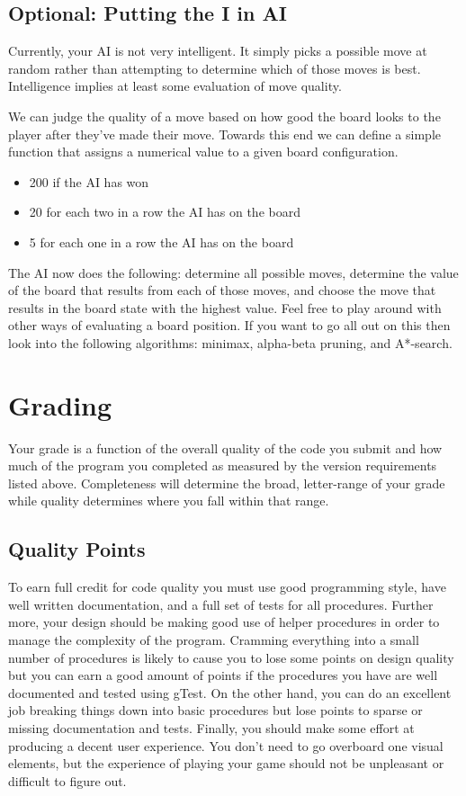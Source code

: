\documentclass[]{tufte-handout}
\begin{document}
\subsection{Optional: Putting the I in AI}

Currently, your AI is not very intelligent. It simply picks a possible move at random
rather than attempting to determine which of those moves is best. Intelligence
implies at least some evaluation of move quality.

We can judge the quality of a move based on how good the board looks to the player
after they've made their move. Towards this end we can define a simple function
that assigns a numerical value to a given board configuration.
\begin{itemize}
  \item 200 if the AI has won
  \item 20 for each two in a row the AI has on the board
  \item 5 for each one in a row the AI has on the board
\end{itemize}
The AI now does the following: determine all possible moves, determine the value
of the board that results from each of those moves, and choose the move that
results in the board state with the highest value. Feel free to play around with
other ways of evaluating a board position. If you want to go all out on this then
look into the following algorithms: minimax, alpha-beta pruning, and A*-search.

\section{Grading}

Your grade is a function of the overall quality of the code you submit and how much of the
program you completed as measured by the version requirements listed above. Completeness
will determine the broad, letter-range of your grade while quality determines where
you fall within that range.

\subsection{Quality Points}

To earn full credit for code quality you must use good programming style, have well written documentation, and a full set of tests for all procedures. Further more, your design should be making good use of helper procedures in order to manage the complexity of the program. Cramming everything into a small number of procedures is likely to cause you to lose some points on design quality but you can earn a good amount of points if the procedures you have are well documented and tested using gTest. On the other hand, you can do an excellent job breaking things down into basic procedures but lose points to sparse or missing documentation and tests. Finally, you should make some effort at producing a decent user experience.  You don't need to go overboard one visual elements, but the
experience of playing your game should not be unpleasant or difficult to figure out.
\end{document}
